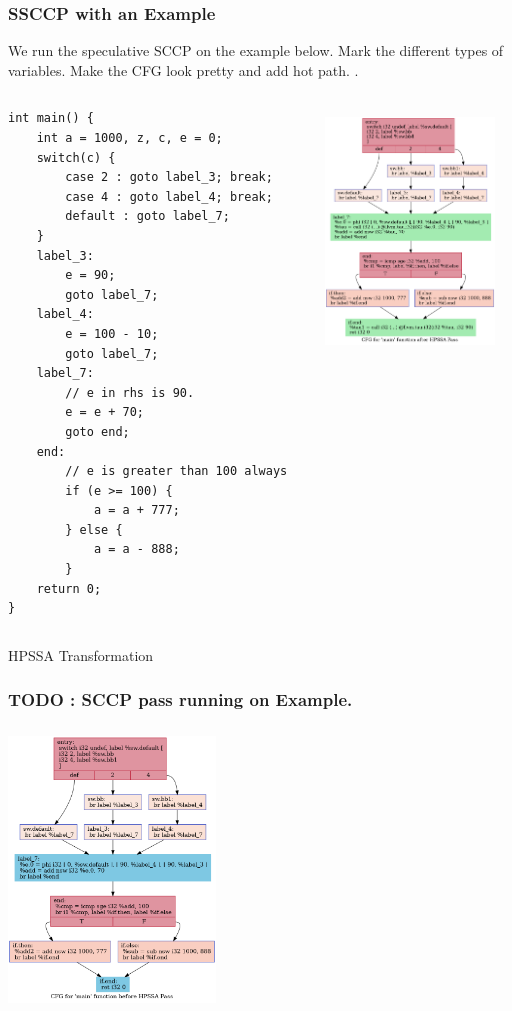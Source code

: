 \documentclass{beamer}
\begin{document}
\begin{frame}[fragile]
	\frametitle{SSCCP with an Example}
	We run the speculative SCCP on the example below. \color{red} Mark the different types of variables. Make the CFG look pretty and add hot path. \color{black}.
	\begin{columns}
		\begin{column}{0.2\textwidth}
			\begin{verbatim}
int main() {
	int a = 1000, z, c, e = 0;
	switch(c) {   
		case 2 : goto label_3; break;
		case 4 : goto label_4; break;
		default : goto label_7; 
	}
	label_3:
		e = 90;
		goto label_7;
	label_4:
		e = 100 - 10;
		goto label_7;
	label_7:
		// e in rhs is 90.
		e = e + 70;  
		goto end;
	end:
		// e is greater than 100 always
		if (e >= 100) {  
			a = a + 777;
		} else {
			a = a - 888;
		} 
	return 0; 
}
			\end{verbatim}
		\end{column}
		\begin{column}{0.5\textwidth}  
			\begin{center}
				\includegraphics[width=4.5cm,height=6.5cm]{afterHPSSA.dot.png}
			\end{center}
		\end{column}
	\end{columns}
\end{frame}

\begin{frame}{HPSSA Transformation}
	\frametitle{TODO : SCCP pass running on Example.}
	\centering
	\includegraphics[width=5.5cm,height=7.5cm]{baseline.dot.png}
\end{frame}
\end{document}

